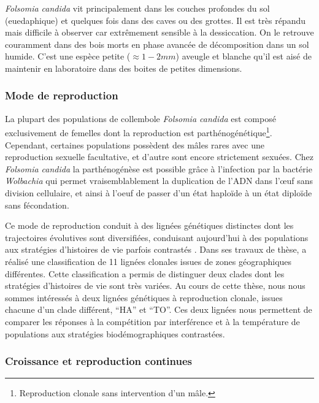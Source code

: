\textit{Folsomia candida} vit principalement dans les couches profondes du sol
(euedaphique) et quelques fois dans des caves ou des grottes. Il est très
répandu mais difficile à observer car extrêmement sensible à la dessiccation. On
le retrouve couramment dans des bois morts en phase avancée de décomposition
dans un sol humide. C'est une espèce petite ($\approx 1 - 2 mm$) aveugle et
blanche qu'il est aisé de maintenir en laboratoire dans des boites de petites
dimensions. 

\subsubsection{Mode de reproduction}

La plupart des populations de collembole \textit{Folsomia candida} est
composé exclusivement de femelles dont la reproduction est
parthénogénétique\footnote{Reproduction clonale sans intervention d'un mâle.}.
Cependant, certaines populations possèdent des mâles rares avec une reproduction
sexuelle facultative, et d'autre sont encore strictement sexuées. Chez
\textit{Folsomia candida} la parthénogénèse est possible grâce à l'infection par
la bactérie \textit{Wolbachia} qui permet vraisemblablement la duplication de
l'ADN dans l'\oe{}uf sans division cellulaire, et ainsi à l'oeuf de passer d'un
état haploïde à un état diploïde sans fécondation. 

Ce mode de reproduction conduit à des lignées génétiques distinctes dont les
trajectoires évolutives sont diversifiées, conduisant aujourd'hui à des
populations aux stratégies d'histoires de vie parfois contrastés
\autocites{tully2004a,tully2008a}. Dans ses travaux de thèse,
\textcites{tully2004a} a réalisé une classification de 11 lignées clonales
issues de zones géographiques différentes. Cette classification a permis de
distinguer deux clades dont les stratégies d'histoires de vie sont très variées.
Au cours de cette thèse, nous nous sommes intéressés à deux lignées génétiques à
reproduction clonale, issues chacune d'un clade différent, ``HA'' et ``TO''. Ces
deux lignées nous permettent de comparer les réponses à la compétition par interférence et à la
température de populations aux stratégies biodémographiques contrastées.

\subsubsection{Croissance et reproduction continues}

